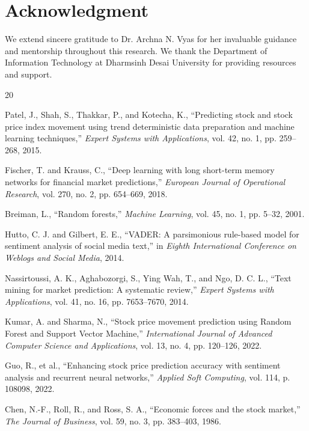 \documentclass[conference]{IEEEtran}
\begin{document}
\section*{Acknowledgment}

We extend sincere gratitude to Dr. Archna N. Vyas for her invaluable guidance and mentorship throughout this research. We thank the Department of Information Technology at Dharmsinh Desai University for providing resources and support.

\begin{thebibliography}{20}

Patel, J., Shah, S., Thakkar, P., and Kotecha, K., ``Predicting stock and stock price index movement using trend deterministic data preparation and machine learning techniques,'' \textit{Expert Systems with Applications}, vol. 42, no. 1, pp. 259--268, 2015.

Fischer, T. and Krauss, C., ``Deep learning with long short-term memory networks for financial market predictions,'' \textit{European Journal of Operational Research}, vol. 270, no. 2, pp. 654--669, 2018.

Breiman, L., ``Random forests,'' \textit{Machine Learning}, vol. 45, no. 1, pp. 5--32, 2001.

Hutto, C. J. and Gilbert, E. E., ``VADER: A parsimonious rule-based model for sentiment analysis of social media text,'' in \textit{Eighth International Conference on Weblogs and Social Media}, 2014.

Nassirtoussi, A. K., Aghabozorgi, S., Ying Wah, T., and Ngo, D. C. L., ``Text mining for market prediction: A systematic review,'' \textit{Expert Systems with Applications}, vol. 41, no. 16, pp. 7653--7670, 2014.

Kumar, A. and Sharma, N., ``Stock price movement prediction using Random Forest and Support Vector Machine,'' \textit{International Journal of Advanced Computer Science and Applications}, vol. 13, no. 4, pp. 120--126, 2022.

Guo, R., et al., ``Enhancing stock price prediction accuracy with sentiment analysis and recurrent neural networks,'' \textit{Applied Soft Computing}, vol. 114, p. 108098, 2022.

Chen, N.-F., Roll, R., and Ross, S. A., ``Economic forces and the stock market,'' \textit{The Journal of Business}, vol. 59, no. 3, pp. 383--403, 1986.


\end{thebibliography}
\end{document}
